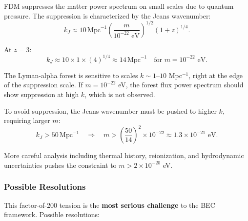 \documentclass[11pt,a4paper]{article}
\newcommand{\Mpc}{\ensuremath{\mathrm{Mpc}}}
\theoremstyle{definition}
\theoremstyle{remark}
\begin{document}
FDM suppresses the matter power spectrum on small scales due to quantum pressure. The suppression is characterized by the Jeans wavenumber:
\begin{equation}
k_J \approx 10 \, \Mpc^{-1} \left(\frac{m}{10^{-22} \text{ eV}}\right)^{1/2} (1+z)^{1/4}.
\end{equation}

At $z = 3$:
\begin{equation}
k_J \approx 10 \times 1 \times (4)^{1/4} \approx 14 \, \Mpc^{-1} \quad \text{for } m = 10^{-22} \text{ eV}.
\end{equation}

The Lyman-alpha forest is sensitive to scales $k \sim 1$--$10$ Mpc$^{-1}$, right at the edge of the suppression scale. If $m = 10^{-22}$ eV, the forest flux power spectrum should show suppression at high $k$, which is not observed.

To avoid suppression, the Jeans wavenumber must be pushed to higher $k$, requiring larger $m$:
\begin{equation}
k_J > 50 \, \Mpc^{-1} \quad \Rightarrow \quad m > \left(\frac{50}{14}\right)^2 \times 10^{-22} \approx 1.3 \times 10^{-21} \text{ eV}.
\end{equation}

More careful analysis including thermal history, reionization, and hydrodynamic uncertainties pushes the constraint to $m > 2 \times 10^{-20}$ eV.

\subsubsection{Possible Resolutions}

This factor-of-200 tension is the \textbf{most serious challenge} to the BEC framework. Possible resolutions:
\end{document}
